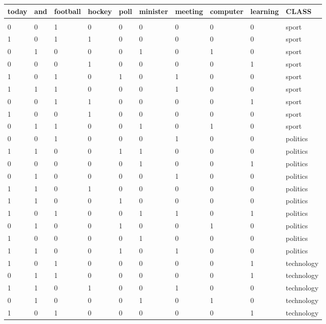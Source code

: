 \documentclass[10pt]{book}
\begin{document}
\begin{table}[h]
\begin{center}
\begin{tabular}{|l|l|l|l|l|l|l|l|l|l|}
\hline
today & and & football & hockey & poll & minister & meeting & computer & learning & CLASS \\
\hline
 &  &  &  &  &  &  &  &  &  \\
\hline
0 & 0 & 1 & 0 & 0 & 0 & 0 & 0 & 0 & sport \\
\hline
1 & 0 & 1 & 1 & 0 & 0 & 0 & 0 & 0 & sport \\
\hline
0 & 1 & 0 & 0 & 0 & 1 & 0 & 1 & 0 & sport \\
\hline
0 & 0 & 0 & 1 & 0 & 0 & 0 & 0 & 1 & sport \\
\hline
1 & 0 & 1 & 0 & 1 & 0 & 1 & 0 & 0 & sport \\
\hline
1 & 1 & 1 & 0 & 0 & 0 & 1 & 0 & 0 & sport \\
\hline
0 & 0 & 1 & 1 & 0 & 0 & 0 & 0 & 1 & sport \\
\hline
1 & 0 & 0 & 1 & 0 & 0 & 0 & 0 & 0 & sport \\
\hline
0 & 1 & 1 & 0 & 0 & 1 & 0 & 1 & 0 & sport \\
\hline
0 & 0 & 1 & 0 & 0 & 0 & 1 & 0 & 0 & politics \\
\hline
1 & 1 & 0 & 0 & 1 & 1 & 0 & 0 & 0 & politics \\
\hline
0 & 0 & 0 & 0 & 0 & 1 & 0 & 0 & 1 & politics \\
\hline
0 & 1 & 0 & 0 & 0 & 0 & 1 & 0 & 0 & politics \\
\hline
1 & 1 & 0 & 1 & 0 & 0 & 0 & 0 & 0 & politics \\
\hline
1 & 1 & 0 & 0 & 1 & 0 & 0 & 0 & 0 & politics \\
\hline
1 & 0 & 1 & 0 & 0 & 1 & 1 & 0 & 1 & politics \\
\hline
0 & 1 & 0 & 0 & 1 & 0 & 0 & 1 & 0 & politics \\
\hline
1 & 0 & 0 & 0 & 0 & 1 & 0 & 0 & 0 & politics \\
\hline
1 & 1 & 0 & 0 & 1 & 0 & 1 & 0 & 0 & politics \\
\hline
1 & 0 & 1 & 0 & 0 & 0 & 0 & 0 & 1 & technology \\
\hline
0 & 1 & 1 & 0 & 0 & 0 & 0 & 0 & 1 & technology \\
\hline
1 & 1 & 0 & 1 & 0 & 0 & 1 & 0 & 0 & technology \\
\hline
0 & 1 & 0 & 0 & 0 & 1 & 0 & 1 & 0 & technology \\
\hline
1 & 0 & 1 & 0 & 0 & 0 & 0 & 0 & 1 & technology \\

\end{tabular}
\end{center}
\end{table}
\end{document}
